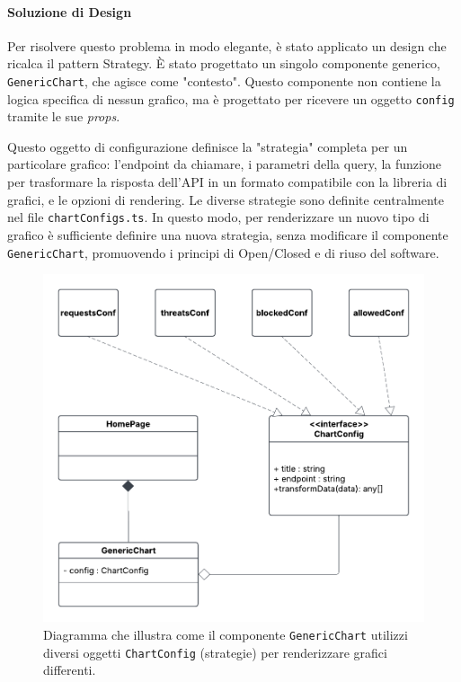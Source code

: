 \documentclass[12pt,a4paper,openright,twoside]{book}
\begin{document}
\paragraph{Soluzione di Design}
Per risolvere questo problema in modo elegante, è stato applicato un design che ricalca il pattern Strategy. È stato progettato un singolo componente generico, \texttt{GenericChart}, che agisce come "contesto". Questo componente non contiene la logica specifica di nessun grafico, ma è progettato per ricevere un oggetto \texttt{config} tramite le sue \textit{props}.

Questo oggetto di configurazione definisce la "strategia" completa per un particolare grafico: l'endpoint da chiamare, i parametri della query, la funzione per trasformare la risposta dell'API in un formato compatibile con la libreria di grafici, e le opzioni di rendering. Le diverse strategie sono definite centralmente nel file \texttt{chartConfigs.ts}. In questo modo, per renderizzare un nuovo tipo di grafico è sufficiente definire una nuova strategia, senza modificare il componente \texttt{GenericChart}, promuovendo i principi di Open/Closed e di riuso del software.

\begin{figure}[htbp]
    \centering
    \includegraphics[width=\textwidth]{figures/strategy.pdf}
    \caption{Diagramma che illustra come il componente \texttt{GenericChart} utilizzi diversi oggetti \texttt{ChartConfig} (strategie) per renderizzare grafici differenti.}
    \label{fig:strategy_frontend_uml}
\end{figure}
\end{document}
